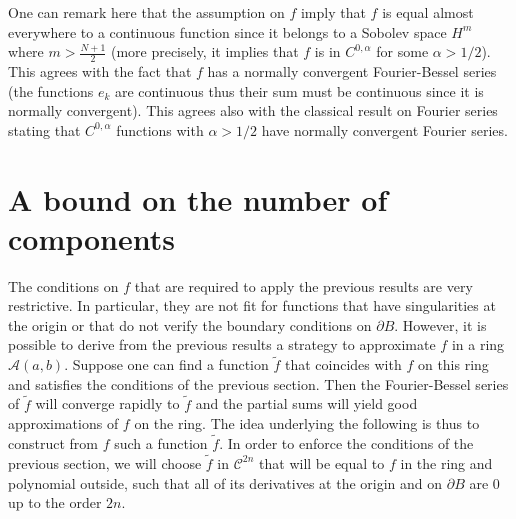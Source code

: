 \documentclass[11pt,a4paper]{article}
\begin{document}
\begin{Rem} One can remark here that the assumption on $f$ imply that $f$ is equal almost everywhere to a continuous function since it belongs to a Sobolev space $H^m$ where $m > \frac{N+1}{2}$ (more precisely, it implies that $f$ is in $C^{0,\alpha}$ for some $\alpha > 1/2$). This agrees with the fact that $f$ has a normally convergent Fourier-Bessel series (the functions $e_k$ are continuous thus their sum must be continuous since it is normally convergent). This agrees also with the classical result on Fourier series stating that $C^{0,\alpha}$ functions with $\alpha > 1/2$ have normally convergent Fourier series. 
\end{Rem}


\section{A bound on the number of components}

The conditions on $f$ that are required to apply the previous results are very restrictive. In particular, they are not fit for functions that have singularities at the origin or that do not verify the boundary conditions on $\partial B$. However, it is possible to derive from the previous results a strategy to approximate $f$ in a ring $\mathcal{A}(a,b)$. Suppose one can find a function $\tilde{f}$ that coincides with $f$ on this ring and satisfies the conditions of the previous section. Then the Fourier-Bessel series of $\tilde{f}$ will converge rapidly to $\tilde{f}$ and the partial sums will yield good approximations of $f$ on the ring. 
The idea underlying the following is thus to construct from $f$ such a function $\tilde{f}$. In order to enforce the conditions of the previous section, we will choose $\tilde{f}$ in $\mathcal{C}^{2n}$ that will be equal to $f$ in the ring and polynomial outside, such that all of its derivatives at the origin and on $\partial B$ are 0 up to the order $2n$.
\end{document}

